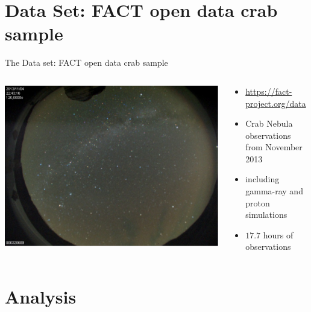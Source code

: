 \section{Data Set: FACT open data crab sample}

\begin{frame}[t]{The Data set: FACT open data crab sample}
\begin{columns}[onlytextwidth]
    \begin{column}{0.475\textwidth}
        \includegraphics[width=\textwidth]{fig/cond.png}
    \end{column}
    \begin{column}{0.475\textwidth}
    \vspace*{\fill}
        \begin{itemize}
            \item \url{https://fact-project.org/data}
            \item Crab Nebula observations from November 2013
            \item including gamma-ray and proton simulations
            \item $17.7$ hours of observations
        \end{itemize}
    \end{column}
\end{columns}
\end{frame}

\section{Analysis}

